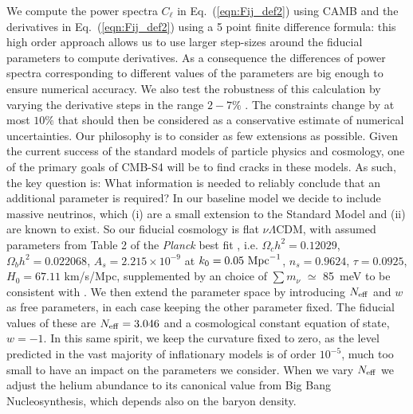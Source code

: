 \documentclass[aps,prd,reprint,superscriptaddress,nofootinbib,floatfix]{revtex4-1}
\newcommand\refeq[1]{Eq.~(\ref{eqn:#1})}
\begin{document}
We compute the power spectra $C_{\ell}$ in \refeq{Fij_def2} using CAMB \cite{Howlett:2012mh,Lewis:1999bs} and
the derivatives in \refeq{Fij_def2} using a 5 point finite difference formula:
this high order approach allows us to use larger step-sizes around the fiducial parameters to compute derivatives. As a consequence the differences of power spectra corresponding to different values of the parameters are big enough to ensure numerical accuracy. We also test the robustness of this calculation by varying the derivative steps in the range $2-7\%$ . The constraints change by at most $10\%$ that should then be considered as a conservative estimate of numerical uncertainties. 
Our philosophy is to consider as few extensions as possible. Given the current success of the standard models of particle physics and cosmology, one of the primary goals of CMB-S4 will be to find cracks in these models. As such, the key question is: What information is needed to reliably conclude that an additional parameter is required? In our baseline model we decide to include massive neutrinos, which (i) are a small extension to the Standard Model and (ii) are known to exist. So our fiducial cosmology is flat $\nu \Lambda$CDM, with assumed 
parameters from Table 2 of the \textit{Planck} best fit \cite{planck-collaboration:2014g}, i.e. $\Omega_c h^2 = 0.12029$, $\Omega_b h^2 = 0.022068$, $A_s = 2.215\times10^{-9}$ at $k_0 = 0.05\ {\rm Mpc}^{-1}$, $n_s = 0.9624$, $\tau = 0.0925$, $H_0 = 67.11$ km/s/Mpc, supplemented by an choice of $\sum m_\nu$ $\simeq$ 85\ meV to be consistent with \cite{wu:2014}.  
We then extend the parameter space by introducing $N_{\rm eff}$ and $w$ as free parameters, in each case keeping the other parameter fixed.
The fiducial values of these are $N_{\rm eff}=3.046$ and a cosmological constant equation of state, $w=-1$. In this same spirit, we keep the curvature fixed to zero, as the level predicted in the vast majority of inflationary models is of order $10^{-5}$, much too small to have an impact on the parameters we consider. When we vary $N_{\rm eff}$ we adjust the helium abundance to its canonical value from Big Bang Nucleosynthesis, which depends also on the baryon density.
\end{document}
